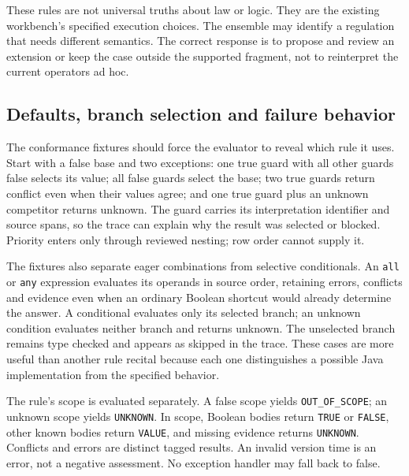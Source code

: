 These rules are not universal truths about law or logic. They are the existing
workbench's specified execution choices. The ensemble may identify a regulation
that needs different semantics. The correct response is to propose and review an
extension or keep the case outside the supported fragment, not to reinterpret
the current operators ad hoc.

\subsection{Defaults, branch selection and failure behavior}
\label{merge:P-03a-rule-contract:02}


The conformance fixtures should force the evaluator to reveal which rule it uses. Start
with a false base and two exceptions: one true guard with all other guards false selects
its value; all false guards select the base; two true guards return conflict even when
their values agree; and one true guard plus an unknown competitor returns unknown. The
guard carries its interpretation identifier and source spans, so the trace can explain
why the result was selected or blocked. Priority enters only through reviewed nesting;
row order cannot supply it.

The fixtures also separate eager combinations from selective conditionals. An \texttt{all} or \texttt{any}
expression evaluates its operands in source order, retaining
errors, conflicts and evidence even when an ordinary Boolean shortcut would already
determine the answer. A conditional evaluates only its selected branch; an unknown
condition evaluates neither branch and returns unknown. The unselected branch remains
type checked and appears as skipped in the trace. These cases are more useful than another rule
recital because each one distinguishes a possible Java implementation
from the specified behavior.


The rule's scope is evaluated separately. A false scope yields
\texttt{OUT\_OF\_SCOPE}; an unknown scope yields \texttt{UNKNOWN}. In scope,
Boolean bodies return \texttt{TRUE} or \texttt{FALSE}, other known bodies return
\texttt{VALUE}, and missing evidence returns \texttt{UNKNOWN}. Conflicts and
errors are distinct tagged results. An invalid version time is an error, not a
negative assessment. No exception handler may fall back to false.

